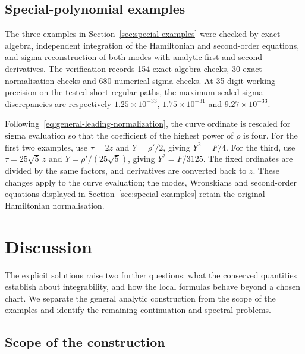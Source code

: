\documentclass[11pt]{article}
\begin{document}
\FloatBarrier

\subsection{Special-polynomial examples}

The three examples in Section~\ref{sec:special-examples} were checked
by exact algebra, independent integration of the Hamiltonian and
second-order equations, and sigma reconstruction of both modes with
analytic first and second derivatives. The verification records 154 exact
algebra checks, 30 exact normalisation checks and 680 numerical sigma
checks. At 35-digit working precision on the tested short regular paths,
the maximum scaled sigma discrepancies are respectively
$1.25\times10^{-33}$, $1.75\times10^{-31}$ and $9.27\times10^{-33}$.

Following~\eqref{eq:general-leading-normalization}, the curve ordinate is rescaled for sigma evaluation so that the
coefficient of the highest power of $\rho$ is four. For the first two
examples, use $\tau=2z$ and $Y=\rho'/2$, giving $Y^2=F/4$.
For the third, use $\tau=25\sqrt5\,z$ and $Y=\rho'/(25\sqrt5)$,
giving $Y^2=F/3125$. The fixed ordinates are divided by the same factors,
and derivatives are converted back to $z$. These changes apply to the
curve evaluation; the modes, Wronskians and second-order equations
displayed in Section~\ref{sec:special-examples} retain the original
Hamiltonian normalisation.

\section{Discussion}\label{sec:discussion}

The explicit solutions raise two further questions: what the conserved quantities establish about integrability, and how the local formulas behave beyond a chosen chart. We separate the general analytic construction from the scope of the examples and identify the remaining continuation and spectral problems.

\subsection{Scope of the construction}
\end{document}

